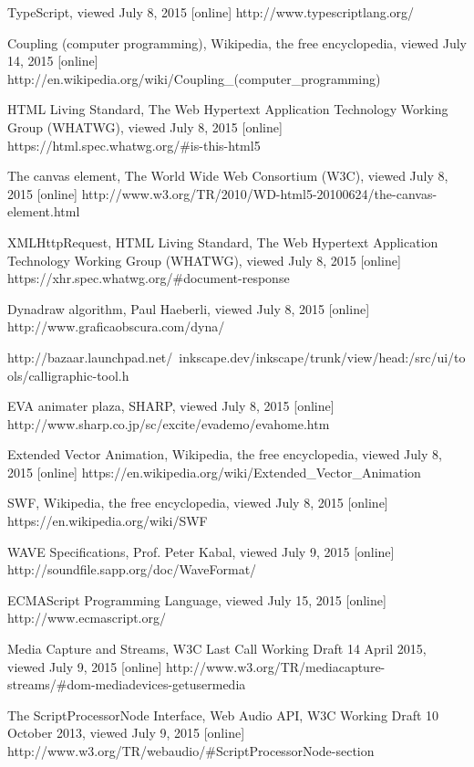 \begin{thebibliography}{99}
TypeScript, viewed July 8, 2015 [online] 
http://www.typescriptlang.org/


Coupling (computer programming), Wikipedia, the free encyclopedia, viewed July 14, 2015 [online]
http://en.wikipedia.org/wiki/Coupling\_(computer\_programming)

HTML Living Standard, The Web Hypertext Application Technology Working Group (WHATWG), viewed July 8, 2015 [online]
https://html.spec.whatwg.org/\#is-this-html5

The canvas element, The World Wide Web Consortium (W3C), viewed July 8, 2015 [online]
http://www.w3.org/TR/2010/WD-html5-20100624/the-canvas-element.html

XMLHttpRequest, HTML Living Standard, The Web Hypertext Application Technology Working Group (WHATWG), viewed July 8, 2015 [online]
https://xhr.spec.whatwg.org/\#document-response


Dynadraw algorithm, Paul Haeberli, viewed July 8, 2015 [online]
http://www.graficaobscura.com/dyna/

http://bazaar.launchpad.net/~inkscape.dev/inkscape/trunk/view/head:/src/ui/tools/calligraphic-tool.h

EVA animater plaza, SHARP, viewed July 8, 2015 [online]
http://www.sharp.co.jp/sc/excite/evademo/evahome.htm

Extended Vector Animation, Wikipedia, the free encyclopedia, viewed July 8, 2015 [online]
https://en.wikipedia.org/wiki/Extended\_Vector\_Animation

SWF, Wikipedia, the free encyclopedia, viewed July 8, 2015 [online]
https://en.wikipedia.org/wiki/SWF

WAVE Specifications, Prof. Peter Kabal, viewed July 9, 2015 [online]
http://soundfile.sapp.org/doc/WaveFormat/


ECMAScript Programming Language, viewed July 15, 2015 [online]
http://www.ecmascript.org/

Media Capture and Streams, W3C Last Call Working Draft 14 April 2015, viewed July 9, 2015 [online]
http://www.w3.org/TR/mediacapture-streams/\#dom-mediadevices-getusermedia

The ScriptProcessorNode Interface, Web Audio API, W3C Working Draft 10 October 2013, viewed July 9, 2015 [online]
http://www.w3.org/TR/webaudio/\#ScriptProcessorNode-section


\end{thebibliography}
